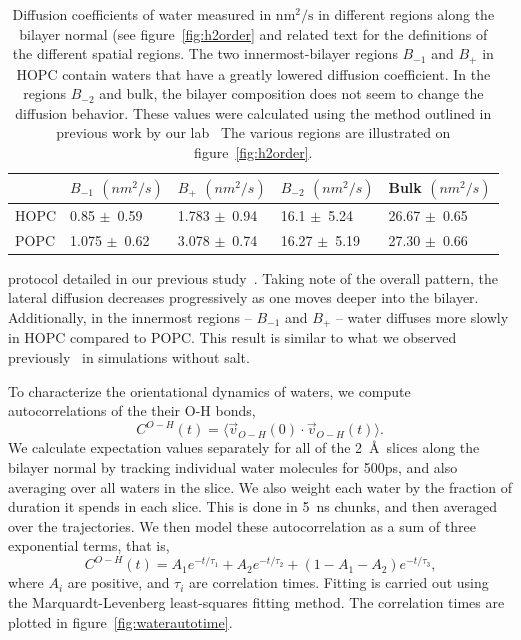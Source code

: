 \documentclass[12pt,preprint,times,openany,draft]{book}
\newcommand{\PM}{$\pm$~}
\begin{document}
\begin{table}[t]
\caption{
Diffusion coefficients of water measured in $\text{nm}^2/\text{s}$ in different regions along the bilayer normal (see figure~\ref{fig:h2order} 
and related text for the definitions of the different spatial regions.
The two innermost-bilayer regions $B_{-1}$ and $B_+$ in HOPC contain waters that have a greatly lowered diffusion coefficient. In the regions $B_{-2}$ and bulk, 
the bilayer composition does not seem to change the diffusion behavior. These values were calculated using the method outlined in previous work by our lab~\cite{kruczek:2017:ether}
The various regions are illustrated on figure~\ref{fig:h2order}.
}
\label{tab:diff}
\begin{tabularx}{\textwidth}{X|X|X|X|X|}%
& $B_{-1}$ $(nm^2/s)$ & $B_+$ $(nm^2/s)$ & $B_{-2}$ $(nm^2/s)$ & Bulk $(nm^2/s)$\\ \hline
HOPC & 0.85 \PM 0.59 & 1.783 \PM 0.94 & 16.1 \PM 5.24 & 26.67 \PM 0.65 \\
POPC & 1.075 \PM 0.62 & 3.078 \PM 0.74 & 16.27 \PM 5.19 & 27.30 \PM 0.66 \\
\end{tabularx}
\end{table}

protocol detailed in our previous study~\cite{kruczek:2017:ether}. Taking note of the overall pattern, the 
lateral diffusion decreases progressively as one moves deeper into the bilayer. Additionally, in the innermost 
regions -- $B_{-1}$ and  $B_+$ -- water diffuses more slowly in HOPC compared to POPC. This result 
is similar to what we observed previously~\cite{kruczek:2017:ether} in simulations without salt.

To characterize the orientational dynamics of waters, we compute autocorrelations of the their O-H bonds,
\begin{equation}
\label{eq:autocorr}
C^{O-H} (t) =\bigg \langle \vec{v}_{O-H}(0) \cdot \vec{v}_{O-H}(t) \bigg \rangle\text{.}
\end{equation}
We calculate expectation values separately for all of the 2~\AA~slices along 
the bilayer normal by tracking individual water molecules for 500ps, and also averaging over all 
waters in the slice. We also weight each water by the fraction of duration it spends in each slice. This is done in 5~ns chunks, and then averaged over the trajectories. 
We then model these autocorrelation as a sum of three exponential terms, that is,
\begin{equation}
\label{eq:fit}
C^{O-H} (t) = A_1 e^{-t/\tau_1} + A_2 e^{-t/\tau_2} + (1 - A_1 - A_2) e^{-t/\tau_3}\text{,}
\end{equation}
where $A_i$ are positive, and $\tau_i$ are correlation times. Fitting is carried out using the 
Marquardt-Levenberg least-squares fitting method. The correlation times are plotted in figure~\ref{fig:waterautotime}. 
\end{document}
